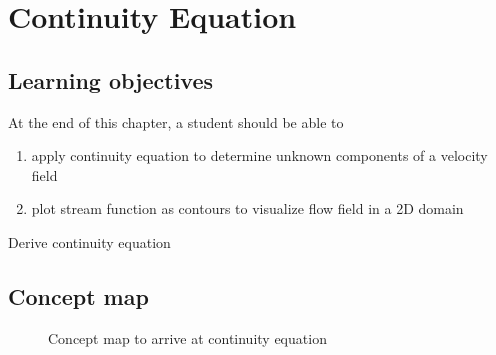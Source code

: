 \chapter{Continuity Equation}
\label{ch:continuity}

\section{Learning objectives}
At the end of this chapter, a student should be able to 
\begin{enumerate}
\item apply continuity equation to determine unknown components of a velocity field
\item plot stream function as contours to visualize flow field in a 2D domain
\end{enumerate}

\begin {lo3} 
Derive continuity equation
\end {lo3}

\section{Concept map}

\begin{figure}[h]
\begin{center}
\end{center}
\caption{Concept map to arrive at continuity equation}
\label{ContinuityEquationConceptMap}
\end{figure}

